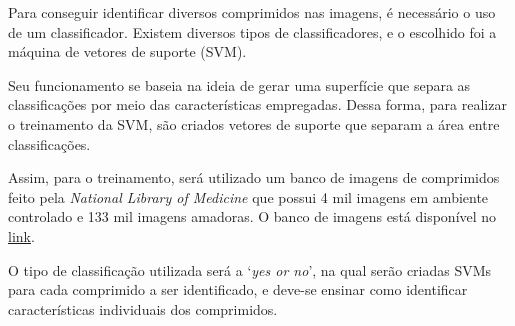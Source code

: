 Para conseguir identificar diversos comprimidos nas imagens, é necessário o uso de um classificador. Existem diversos tipos de classificadores, e o escolhido foi a máquina de vetores de suporte (SVM). 

Seu funcionamento se baseia na ideia de gerar uma superfície que separa as classificações por meio das características empregadas. Dessa forma, para realizar o treinamento da SVM, são criados vetores de suporte que separam a área entre classificações.

Assim, para o treinamento, será utilizado um banco de imagens de comprimidos feito pela \textit{National Library of Medicine} que possui 4 mil imagens em ambiente controlado e 133 mil imagens amadoras. O banco de imagens está disponível no  \href{https://www.nlm.nih.gov/databases/download/data_distrib_main.html}{link}. 

O tipo de classificação utilizada será a `\textit{yes or no}', na qual serão criadas SVMs para cada comprimido a ser identificado, e deve-se ensinar como identificar características individuais dos comprimidos.

